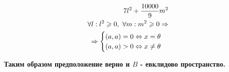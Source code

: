 \begin{enumerate}
{\begin{align*}
          \mtxa l^2 + \mtxb m^2                                             \\
          \forall l:l^2 \geqslant 0,\ \forall m:m^2 \geqslant 0 \Rightarrow \\
          \Rightarrow
          \begin{cases}
            (a,a) = 0 \Leftrightarrow x = \theta \\
            (a,a) > 0 \Leftrightarrow x \ne \theta
          \end{cases}
        \end{align*}
        }
\end{enumerate}
\textbf{Таким образом предположение верно и $B$ - евклидово пространство.}